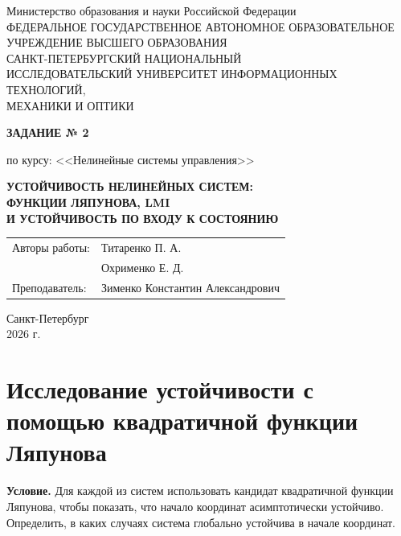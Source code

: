 \documentclass[12pt,a4paper]{article}
\begin{document}
	
	\begin{titlepage}
		\begin{center}
			\small Министерство образования и науки Российской Федерации\\[2mm]
			\normalsize
			ФЕДЕРАЛЬНОЕ ГОСУДАРСТВЕННОЕ АВТОНОМНОЕ ОБРАЗОВАТЕЛЬНОЕ\\
			УЧРЕЖДЕНИЕ ВЫСШЕГО ОБРАЗОВАНИЯ\\[3mm]
			САНКТ-ПЕТЕРБУРГСКИЙ НАЦИОНАЛЬНЫЙ\\
			ИССЛЕДОВАТЕЛЬСКИЙ УНИВЕРСИТЕТ ИНФОРМАЦИОННЫХ\\
			ТЕХНОЛОГИЙ,\\
			МЕХАНИКИ И ОПТИКИ
			
			\vspace{20mm}
			{\Large\bfseries ЗАДАНИЕ № 2}
			
			\vspace{4mm}
			{\small по курсу: <<Нелинейные системы управления>>}
			
			\vspace{8mm}
			{\large\bfseries УСТОЙЧИВОСТЬ НЕЛИНЕЙНЫХ СИСТЕМ:\\
				ФУНКЦИИ ЛЯПУНОВА, LMI\\
				И УСТОЙЧИВОСТЬ ПО ВХОДУ К СОСТОЯНИЮ}
			
			\vspace{30mm}
			\hfill
			\begin{tabular}{ll}
				Авторы работы: & Титаренко П. А.\\
				& Охрименко Е. Д.\\[2mm]
				Преподаватель: & Зименко Константин Александрович
			\end{tabular}
		\end{center}
		
		
		\vfill
		\begin{center}
			Санкт-Петербург\\
			2026 г.
		\end{center}
	\end{titlepage}
	
	\tableofcontents
	\newpage
	
	\section{Исследование устойчивости с помощью квадратичной функции Ляпунова}
	
	\textbf{Условие.} Для каждой из систем использовать кандидат квадратичной функции Ляпунова,
	чтобы показать, что начало координат асимптотически устойчиво. Определить, в каких случаях
	система глобально устойчива в начале координат.
	
\end{document}
